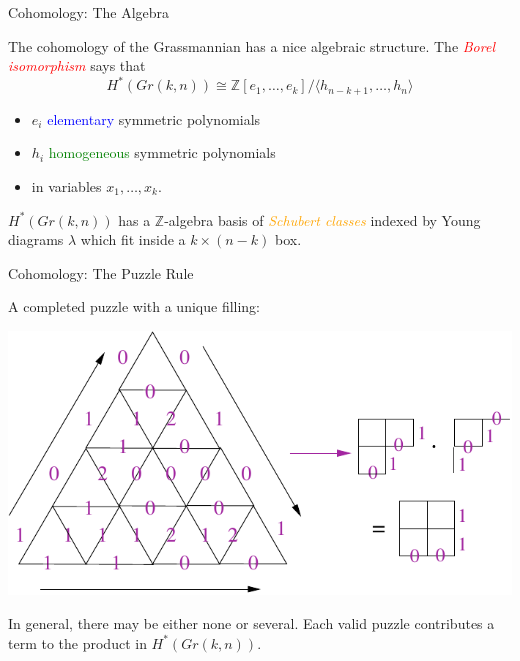\documentclass{beamer}
\newcommand{\Z}{\mathbb{Z}}
\begin{document}


\begin{frame}{Cohomology: The Algebra}


The cohomology of the Grassmannian has a nice algebraic structure. The \textcolor{red}{\emph{Borel isomorphism}} says that
$$H^*(Gr(k,n)) \cong \mathbb{Z}[e_1, \ldots, e_k]/ \langle h_{n-k+1}, \ldots, h_n \rangle$$
\begin{itemize}
\item $e_i$ \textcolor{blue}{elementary} symmetric polynomials
\item $h_i$ \textcolor{green}{homogeneous} symmetric polynomials
\item in variables $x_1, \ldots, x_k$.
\end{itemize}
\medskip
$H^*(Gr(k,n))$ has a $\Z$-algebra basis of \textcolor{orange}{\emph{Schubert classes}} indexed by Young diagrams $\lambda$ which fit inside a $k \times (n-k)$ box. 

\end{frame}





\begin{frame}{Cohomology: The Puzzle Rule}


A completed puzzle with a unique filling: 

\begin{center} \includegraphics[scale=.7]{PuzzleFilled}\end{center}

In general, there may be either none or several.  Each valid puzzle contributes a term to the product in $H^*(Gr(k,n))$.

\end{frame} 
\end{document}
